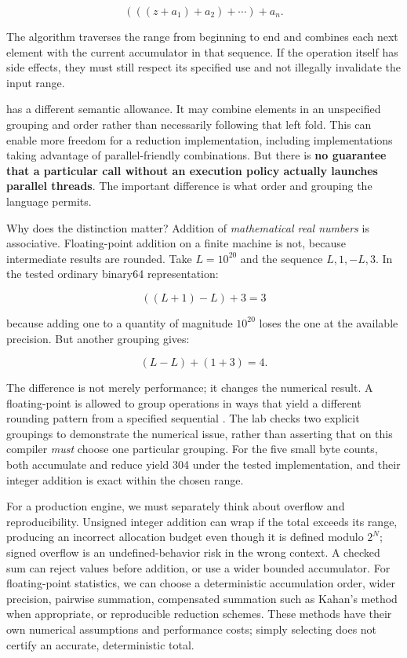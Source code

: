\[
(((z+a_1)+a_2)+\cdots)+a_n.
\]

The algorithm traverses the range from beginning to end and combines each next element with the current accumulator in that sequence. If the operation itself has side effects, they must still respect its specified use and not illegally invalidate the input range.

 has a different semantic allowance. It may combine elements in an unspecified grouping and order rather than necessarily following that left fold. This can enable more freedom for a reduction implementation, including implementations taking advantage of parallel-friendly combinations. But there is \textbf{no guarantee that a particular call without an execution policy actually launches parallel threads}. The important difference is what order and grouping the language permits.

Why does the distinction matter? Addition of \emph{mathematical real numbers} is associative. Floating-point addition on a finite machine is not, because intermediate results are rounded. Take \(L=10^{20}\) and the sequence \(L,1,-L,3\). In the tested ordinary binary64 representation:

\[
((L+1)-L)+3 = 3
\]

because adding one to a quantity of magnitude \(10^{20}\) loses the one at the available precision. But another grouping gives:

\[
(L-L)+(1+3)=4.
\]

The difference is not merely performance; it changes the numerical result. A floating-point  is allowed to group operations in ways that yield a different rounding pattern from a specified sequential . The lab checks two explicit groupings to demonstrate the numerical issue, rather than asserting that  on this compiler \emph{must} choose one particular grouping. For the five small  byte counts, both accumulate and reduce yield 304 under the tested implementation, and their integer addition is exact within the chosen range.

For a production engine, we must separately think about overflow and reproducibility. Unsigned integer addition can wrap if the total exceeds its range, producing an incorrect allocation budget even though it is defined modulo \(2^N\); signed overflow is an undefined-behavior risk in the wrong context. A checked sum can reject values before addition, or use a wider bounded accumulator. For floating-point statistics, we can choose a deterministic accumulation order, wider precision, pairwise summation, compensated summation such as Kahan's method when appropriate, or reproducible reduction schemes. These methods have their own numerical assumptions and performance costs; simply selecting  does not certify an accurate, deterministic total.

